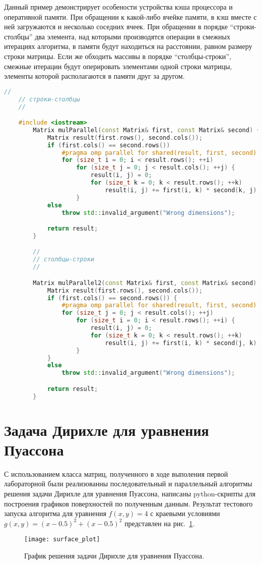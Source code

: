 \documentclass{article}
\begin{document}
	Данный пример демонстрирует особености устройства кэша процессора и оперативной памяти. При обращении к какой-либо ячейке памяти, в кэш вместе с ней загружаются и несколько соседних ячеек. При обращении в порядке ``строки-столбцы'' два элемента, над которыми производятся операции в смежных итерациях алгоритма, в памяти будут находиться на расстоянии, равном размеру строки матрицы. Если же обходить массивы в порядке ``столбцы-строки'', смежные итерации будут оперировать элементами одной строки матрицы, элементы которой располагаются в памяти друг за другом.
	
	\begin{lstlisting}[language=C++, caption={Два способа обхода матрицы}, label={lst:matrixLookup}, texcl=true]
	//
	// строки-столбцы
	//

	#include <iostream>
		Matrix mulParallel(const Matrix& first, const Matrix& second) {
			Matrix result(first.rows(), second.cols());
			if (first.cols() == second.rows())
				#pragma omp parallel for shared(result, first, second)
				for (size_t i = 0; i < result.rows(); ++i) 
					for (size_t j = 0; j < result.cols(); ++j) {
						result(i, j) = 0;
						for (size_t k = 0; k < result.rows(); ++k) 
							result(i, j) += first(i, k) * second(k, j);
					}
			else
				throw std::invalid_argument("Wrong dimensions");

			return result;
		}

		//
		// столбцы-строки
		//

		Matrix mulParallel2(const Matrix& first, const Matrix& second) {
			Matrix result(first.rows(), second.cols());
			if (first.cols() == second.rows()) {
				#pragma omp parallel for shared(result, first, second)
				for (size_t j = 0; j < result.cols(); ++j) 
					for (size_t i = 0; i < result.rows(); ++i) {
						result(i, j) = 0;
						for (size_t k = 0; k < result.rows(); ++k) 
							result(i, j) += first(i, k) * second(j, k);
					}
			}
			else
				throw std::invalid_argument("Wrong dimensions");

			return result;
		}

	\end{lstlisting}
	\section{Задача Дирихле для уравнения Пуассона}\label{sec:lab2}

	С использованием класса матриц, полученного в ходе выполения первой лабораторной были реализованны последовательный и параллельный алгоритмы решения задачи Дирихле для уравнения Пуассона, написаны python-скрипты для построения графиков поверхностей по полученным данным.
	Результат тестового запуска алгоритма для уравнения $f(x,y) = 4$ с краевыми условиями $g(x,y) =(x - 0.5)^2 + (x - 0.5)^2$ представлен на рис.~\ref{fig:surfPlot}.
	\begin{figure}[h]
		\centering
		\texttt{[image: surface\_plot]}
		\caption{График решения задачи Дирихле для уравнения Пуассона.}
		\label{fig:surfPlot} 
	\end{figure}
\end{document}
